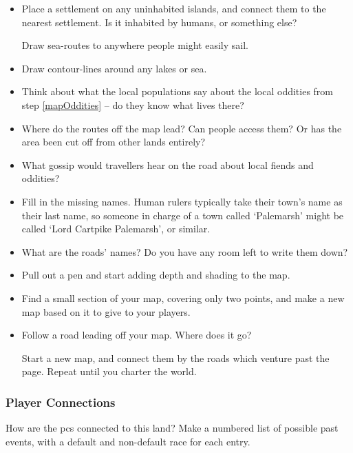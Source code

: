 \begin{multicols}{2}
\begin{itemize}
  \item
  Place a settlement on any uninhabited islands, and connect them to the nearest settlement.
  Is it inhabited by humans, or something else?

  Draw sea-routes to anywhere people might easily sail.
  \item
  Draw contour-lines around any lakes or sea.
  \item
  Think about what the local populations say about the local oddities from step \ref{mapOddities} -- do they know what lives there?
  \item
  Where do the routes off the map lead?
  Can people access them?
  Or has the area been cut off from other lands entirely?
  \item
  What gossip would travellers hear on the road about local fiends and oddities?
  \item
  Fill in the missing names.
  Human rulers typically take their town's name as their last name, so someone in charge of a town called `Palemarsh' might be called  `Lord Cartpike Palemarsh', or similar.
  \item
  What are the roads' names?
  Do you have any room left to write them down?
  \item
  Pull out a pen and start adding depth and shading to the map.
  \item
  Find a small section of your map, covering only two points, and make a new map based on it to give to your players.
  \item
  Follow a road leading off your map.
  Where does it go?

  Start a new map, and connect them by the roads which venture past the page.
  Repeat until you charter the world.
\end{itemize}

\bigLine

\subsubsection{Player Connections}

How are the \glspl{pc} connected to this land?
Make a numbered list of possible past events, with a default and non-default race for each entry.


\end{multicols}
